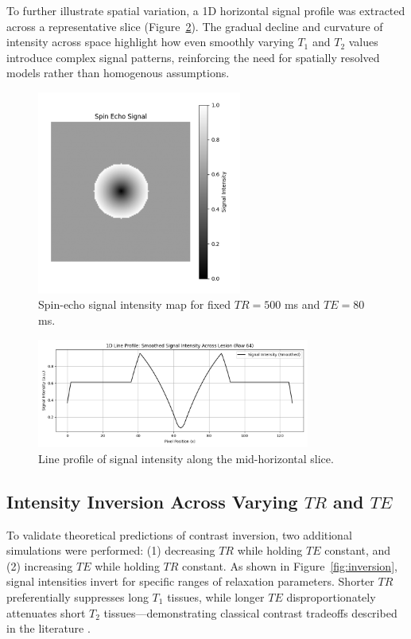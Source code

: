 \documentclass[10pt,a4paper,twoside]{article}
\begin{document}
To further illustrate spatial variation, a 1D horizontal signal profile was extracted across a representative slice (Figure~\ref{fig:lineprofile}). The gradual decline and curvature of intensity across space highlight how even smoothly varying \( T_1 \) and \( T_2 \) values introduce complex signal patterns, reinforcing the need for spatially resolved models rather than homogenous assumptions.

\begin{figure}[htbp!]
\centering
\includegraphics[width=0.6\textwidth]{signalintensitymap.png}
\caption{Spin-echo signal intensity map for fixed \( TR = 500 \) ms and \( TE = 80 \) ms.}
\label{fig:signalmap}
\end{figure}

\begin{figure}[htbp!]
\centering
\includegraphics[width=0.8\textwidth]{1Dlineprofilesignal.png}
\caption{Line profile of signal intensity along the mid-horizontal slice.}
\label{fig:lineprofile}
\end{figure}

\subsection{Intensity Inversion Across Varying \( TR \) and \( TE \)}

To validate theoretical predictions of contrast inversion, two additional simulations were performed: (1) decreasing \( TR \) while holding \( TE \) constant, and (2) increasing \( TE \) while holding \( TR \) constant. As shown in Figure~\ref{fig:inversion}, signal intensities invert for specific ranges of relaxation parameters. Shorter \( TR \) preferentially suppresses long \( T_1 \) tissues, while longer \( TE \) disproportionately attenuates short \( T_2 \) tissues—demonstrating classical contrast tradeoffs described in the literature \cite{brown2014}.
\end{document}

